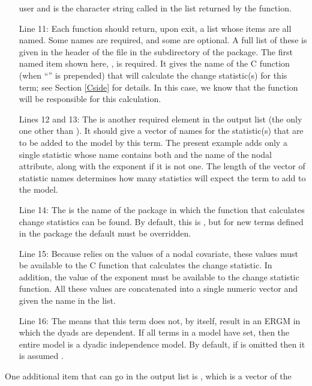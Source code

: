\documentclass[article]{jss}
\begin{document}
\begin{itemize}
user and is the character string called  in the list returned by the
 function.
\item[Line 11:]  Each  function should return, upon exit,
a list whose items are all named.  Some names are required, and some
are optional.  A full list of these is given in the header of the 
file in the  subdirectory of the  package.  
The first named item shown here, , is required.  It gives the name 
of the C function (when ``'' is prepended) that will calculate the
change statistic(s) for this term; see Section \ref{Cside} for details.  In this case,
we know that the function  will be responsible for this calculation.
\item [Lines 12 and 13:]  The  is another required element in the output
list (the only one other than ).  It should give a vector of names
for the statistic(s) that are to be added to the model by this term.  The present
example adds only a single statistic whose name contains 
both  and the name of the nodal attribute, along with the exponent
 if it is not one.  The length of the vector of statistic names determines how
many statistics  will expect the term to add to the model.
\item [Line 14:]
The  is the name of the  package in which the 
 function that calculates change statistics can be found.  By default,
this is , but for new terms defined in the  package
the default must be overridden.
\item [Line 15:]
Because  relies on the values of a nodal covariate, these values must be available to 
the C function that calculates the change statistic.  In addition, the value of the
 exponent must be available to the change statistic function.  All these values
are concatenated into a single numeric vector and given the name  in the
list.
\item[Line 16:]  The  means that this term does not, by itself, 
result in an ERGM in which the dyads are dependent.   If all terms in a model 
have  set, then the entire model is a dyadic independence
model.  By default, if  is omitted then it is assumed .
\end{itemize}
One additional item that can go
in the output list is , which is a vector of the
\end{document}
